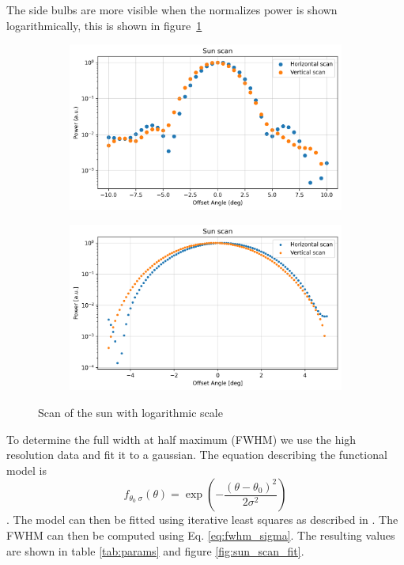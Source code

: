 The side bulbs are more visible when the normalizes power is shown logarithmically, this is shown in figure~\ref{fig:sun_scan_log}
\begin{figure}[H]
    \centering
    \begin{subfigure}[t]{0.45\linewidth}
        \includegraphics[width=\linewidth]{assets/sun_scan_low_res_log.png}
    \end{subfigure}
    \begin{subfigure}[t]{0.45\linewidth}
        \includegraphics[width=\linewidth]{assets/sun_scan_high_res_log.png}
    \end{subfigure}
    \caption{Scan of the sun with logarithmic scale}
    \label{fig:sun_scan_log}
\end{figure}

To determine the full width at half maximum (FWHM) we use the high resolution data and fit it to a gaussian.
The equation describing the functional model is
\begin{equation}
    f_{\theta_0\;\sigma}(\theta) = \exp{\left(-\frac{(\theta-\theta_0)^2}{2\sigma^2}\right)}
\end{equation}.
The model can then be fitted using iterative least squares as described in \cite{ghilani_adjustment_2006}. The FWHM can then be computed using Eq. \eqref{eq:fwhm_sigma}.
The resulting values are shown in table \ref{tab:params} and figure \ref{fig:sun_scan_fit}.

